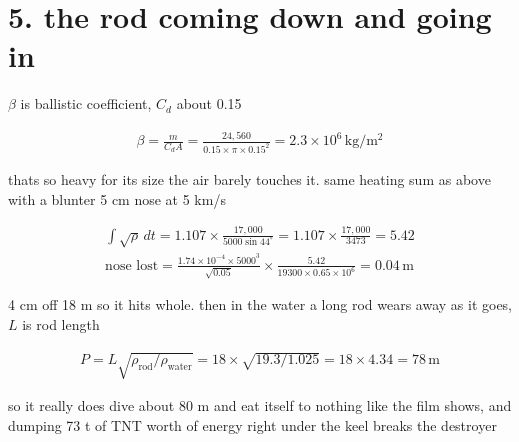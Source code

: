 \documentclass[11pt]{article}
\newcommand{\un}[1]{\,\mathrm{#1}}
\begin{document}
\section*{5. the rod coming down and going in}

$\beta$ is ballistic coefficient, $C_d$ about 0.15

\begin{align*}
\beta = \frac{m}{C_d A} = \frac{24{,}560}{0.15 \times \pi \times 0.15^2} = 2.3\times10^6\un{kg/m^2}
\end{align*}

thats so heavy for its size the air barely touches it. same heating sum as above with a blunter 5 cm nose at 5 km/s

\begin{align*}
\int\!\sqrt{\rho}\,dt = 1.107 \times \frac{17{,}000}{5000\sin44^\circ} = 1.107 \times \frac{17{,}000}{3473} = 5.42\\
\text{nose lost} = \frac{1.74\times10^{-4} \times 5000^3}{\sqrt{0.05}} \times \frac{5.42}{19300 \times 0.65\times10^6} = 0.04\un{m}
\end{align*}

4 cm off 18 m so it hits whole. then in the water a long rod wears away as it goes, $L$ is rod length

\begin{align*}
P = L\sqrt{\rho_{\text{rod}}/\rho_{\text{water}}} = 18 \times \sqrt{19.3/1.025} = 18 \times 4.34 = 78\un{m}
\end{align*}

so it really does dive about 80 m and eat itself to nothing like the film shows, and dumping 73 t of TNT worth of energy right under the keel breaks the destroyer
\end{document}
